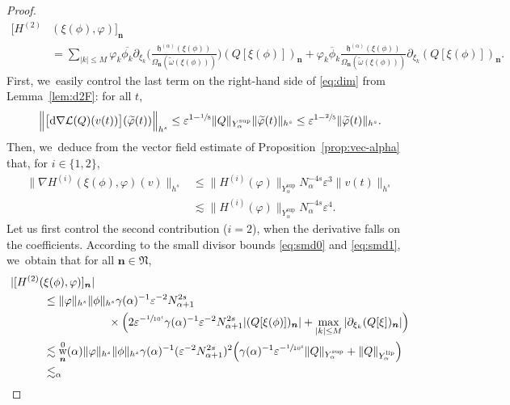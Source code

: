 \documentclass[JEP,XML,SOM,Unicode,published]{cedram}
\DeclareMathOperator{\rw}{w}
\theoremstyle{plain}
\theoremstyle{definition}
\newcommand{\nb}{{\boldsymbol n}}
\newcommand{\Nb}{{\boldsymbol{\mathfrak{N}}}}
\newcommand{\1}{\mathbf{1}}
\newcommand{\Ysup}[1]{Y_{#1}^{\mathrm{sup}}}
\newcommand{\Ylip}[1]{Y_{#1}^{\mathrm{lip}}}
\let\epsilon\varepsilon
\begin{document}
\begin{proof}
\begin{equation*}
\begin{split}
[H^{(2)}&(\xi(\phi),\varphi)]_{\nb} \\
&=
\sum_{|k|\leq M}
\varphi_{k}\overline{\phi_{k}}
\partial_{\xi_{k}}
\Big(
\frac{\mathfrak{h}^{(\alpha)}(\xi(\phi))}
{\Omega_{\nb}(\widetilde{\omega}(\xi(\phi)))}
\Big)
(Q[\xi(\phi)])_{\nb}
+
\varphi_{k}\overline{\phi}_{k}
\frac{\mathfrak{h}^{(\alpha)}(\xi(\phi))}
{\Omega_{\nb}(\widetilde{\omega}(\xi(\phi)))}\partial_{\xi_{k}}
(Q[\xi(\phi)])_{\nb}.
\end{split}
\end{equation*}
First, we~easily control the last term on the right-hand side of \eqref{eq:dim} from Lemma~\ref{lem:d2F}: for all $t$,
\[
\Big\|\big[\mathrm{d}\nabla\mathcal{L}(Q)(v(t))\big](\widetilde{\varphi}(t))\Big \|_{h^{s}}
\leq
\epsilon^{1-\sfrac{1}{8}}
\|Q\|_{\Ysup{\alpha}}
\|\widetilde{\varphi}(t)\|_{h^{s}}
\leq
\epsilon^{1-\sfrac{2}{5}}
\|\widetilde{\varphi}(t)\|_{h^{s}}.
\]
Then, we~deduce from the vector field estimate of Proposition~\ref{prop:vec-alpha} that, for $i\in\{1,2\}$,
\begin{equation}
\label{eq:aprem}
\begin{split}
\| \nabla H^{(i)}(\xi(\phi),\varphi)(v)\|_{h^{s}}
&\leq
\|
H^{(i)}(\varphi)
\|_{\Ysup{\alpha}}
N_{\alpha}^{-4s}\epsilon^{3}\|v(t)\|_{h^{s}}\\
&\lesssim
\|
H^{(i)}(\varphi)
\|_{\Ysup{\alpha}}
N_{\alpha}^{-4s}\epsilon^{4}.
\end{split}
\end{equation}
Let us first control the second contribution ($i=2$), when the derivative falls on the coefficients. According to the small divisor bounds \eqref{eq:smd0} and \eqref{eq:smd1}, we~obtain that for all $\nb\in\Nb$,\vspace*{-3pt}
\begin{align*}
|[H^{(2)}(&\xi(\phi),\varphi)]_{\nb}|
\\
&\leq
\|\varphi\|_{h^{s}}\|\phi\|_{h^{s}}
\gamma(\alpha)^{-1}\epsilon^{-2}N_{\alpha+1}^{2s}
\\
&\hspace*{2cm}\times \Big(
2\epsilon^{-\sfrac{1}{10^{4}}}
\gamma(\alpha)^{-1}\epsilon^{-2}N_{\alpha+1}^{2s}
|(Q[\xi(\phi)])_{\nb}|
+
\max_{|k|\leq M}|\partial_{\xi_{k}}(Q[\xi])_{\nb}|
\Big) \\
&\lesssim
\rw_{\nb}^{0}(\alpha)
\|\varphi\|_{h^{s}}\|\phi\|_{h^{s}}
\gamma(\alpha)^{-1}(\epsilon^{-2}N_{\alpha+1}^{2s})^{2}
\Big(
\gamma(\alpha)^{-1}\epsilon^{-\sfrac{1}{10^{4}}}\|Q\|_{\Ysup{\alpha}}
+
\|Q\|_{\Ylip{\alpha}}
\Big)
\\
&\lesssim_{\alpha}

\end{align*}
\end{proof}
\end{document}
